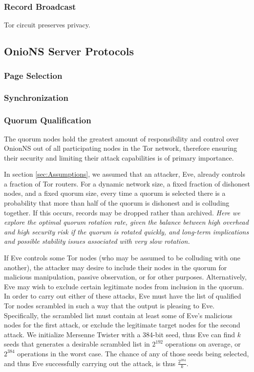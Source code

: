 \subsubsection{Record Broadcast}

Tor circuit preserves privacy.

\subsection{OnioNS Server Protocols}

\subsubsection{Page Selection}

\subsubsection{Synchronization}

\subsubsection{Quorum Qualification}

The quorum nodes hold the greatest amount of responsibility and control over OnionNS out of all participating nodes in the Tor network, therefore ensuring their security and limiting their attack capabilities is of primary importance.

In section \ref{sec:Assumptions}, we assumed that an attacker, Eve, already controls a fraction of Tor routers. For a dynamic network size, a fixed fraction of dishonest nodes, and a fixed quorum size, every time a quorum is selected there is a probability that more than half of the quorum is dishonest and is colluding together. If this occurs, records may be dropped rather than archived. \emph{Here we explore the optimal quorum rotation rate, given the balance between high overhead and high security risk if the quorum is rotated quickly, and long-term implications and possible stability issues associated with very slow rotation.}

If Eve controls some Tor nodes (who may be assumed to be colluding with one another), the attacker may desire to include their nodes in the quorum for malicious manipulation, passive observation, or for other purposes. Alternatively, Eve may wish to exclude certain legitimate nodes from inclusion in the quorum. In order to carry out either of these attacks, Eve must have the list of qualified Tor nodes scrambled in such a way that the output is pleasing to Eve. Specifically, the scrambled list must contain at least some of Eve's malicious nodes for the first attack, or exclude the legitimate target nodes for the second attack. We initialize Mersenne Twister with a 384-bit seed, thus Eve can find $ k $ seeds that generates a desirable scrambled list in $ 2^{192} $ operations on average, or $ 2^{384} $ operations in the worst case. The chance of any of those seeds being selected, and thus Eve successfully carrying out the attack, is thus $ \frac{2^{384}}{k} $.

